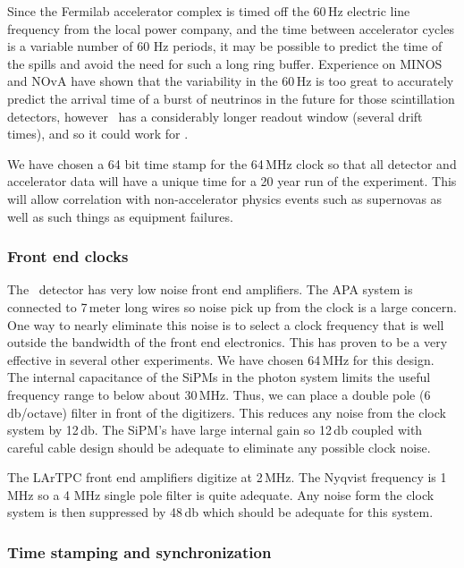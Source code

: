 Since the Fermilab accelerator complex is timed off the 60\,Hz electric
line frequency from the local power company, and the time between
accelerator cycles is a variable number of 60 Hz periods, it may be
possible to predict the time of the spills and avoid the need for such
a long ring buffer.  Experience on MINOS and NOvA have shown that the
variability in the 60\,Hz is too great to accurately predict the
arrival time of a burst of neutrinos in the future for those scintillation detectors, 
however \LBNE\ has a
considerably longer readout window (several drift times), and so it
could work for \LBNE.

We have chosen a 64 bit time stamp for the 64\,MHz clock so that all
detector and accelerator data will have a unique time for a 20 year
run of the experiment.  This will allow correlation with
non-accelerator physics events such as supernovas as well as such
things as equipment failures.

\subsubsection{Front end clocks}

The \LBNE\ detector has very low noise front end amplifiers.  The APA
system is connected to 7\,meter long wires so noise pick up from the
clock is a large concern.  One way to nearly eliminate this noise is
to select a clock frequency that is well outside the bandwidth of the
front end electronics.  This has proven to be a very effective in
several other experiments.  We have chosen 64\,MHz for this design.
The internal capacitance of the SiPMs in the photon system limits the
useful frequency range to 
below about 30\,MHz.  Thus, we can place a double pole (6\,db/octave) filter
in front of the digitizers. This reduces any noise from the clock
system by 12\,db.  The SiPM's have large internal gain so 12\,db
coupled with careful cable design should be adequate to eliminate any
possible clock noise.

The LArTPC front end amplifiers digitize at 2\,MHz.  The Nyqvist
frequency is 1 MHz so a 4 MHz single pole filter is quite adequate.
Any noise form the clock system is then suppressed by 48\,db which
should be adequate for this system.

\subsubsection{Time stamping and synchronization}

